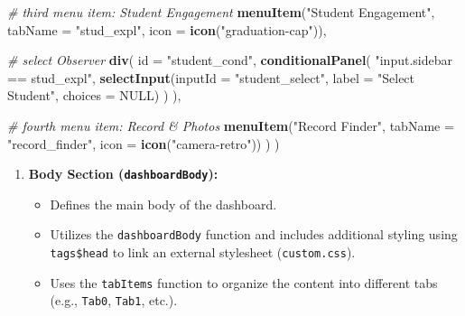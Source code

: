 \documentclass[
]{book}
\newenvironment{Shaded}{\begin{snugshade}}{\end{snugshade}}
\newcommand{\AttributeTok}[1]{\textcolor[rgb]{0.13,0.29,0.53}{#1}}
\newcommand{\CommentTok}[1]{\textcolor[rgb]{0.56,0.35,0.01}{\textit{#1}}}
\newcommand{\ConstantTok}[1]{\textcolor[rgb]{0.56,0.35,0.01}{#1}}
\newcommand{\FunctionTok}[1]{\textcolor[rgb]{0.13,0.29,0.53}{\textbf{#1}}}
\newcommand{\NormalTok}[1]{#1}
\newcommand{\StringTok}[1]{\textcolor[rgb]{0.31,0.60,0.02}{#1}}
\providecommand{\tightlist}{%
  \setlength{\itemsep}{0pt}\setlength{\parskip}{0pt}}
\begin{document}
\begin{Shaded}
\begin{Highlighting}[]
    \CommentTok{\# third menu item: Student Engagement}
    \FunctionTok{menuItem}\NormalTok{(}\StringTok{"Student Engagement"}\NormalTok{, }\AttributeTok{tabName =} \StringTok{"stud\_expl"}\NormalTok{, }\AttributeTok{icon =} \FunctionTok{icon}\NormalTok{(}\StringTok{"graduation{-}cap"}\NormalTok{)),}
    
    \CommentTok{\# select Observer}
    \FunctionTok{div}\NormalTok{(}
      \AttributeTok{id =} \StringTok{"student\_cond"}\NormalTok{,}
      \FunctionTok{conditionalPanel}\NormalTok{(}
        \StringTok{"input.sidebar == \textquotesingle{}stud\_expl\textquotesingle{}"}\NormalTok{,}
        \FunctionTok{selectInput}\NormalTok{(}\AttributeTok{inputId =} \StringTok{"student\_select"}\NormalTok{, }\AttributeTok{label =} \StringTok{"Select Student"}\NormalTok{, }\AttributeTok{choices =} \ConstantTok{NULL}\NormalTok{)}
\NormalTok{      )}
\NormalTok{    ),}
    
    \CommentTok{\# fourth menu item: Record \& Photos}
    \FunctionTok{menuItem}\NormalTok{(}\StringTok{"Record Finder"}\NormalTok{, }\AttributeTok{tabName =} \StringTok{"record\_finder"}\NormalTok{, }\AttributeTok{icon =} \FunctionTok{icon}\NormalTok{(}\StringTok{"camera{-}retro"}\NormalTok{))}
\NormalTok{  )}
\NormalTok{)}
\end{Highlighting}
\end{Shaded}

\begin{enumerate}
\def\labelenumi{\arabic{enumi}.}
\setcounter{enumi}{2}
\tightlist
\item
  \textbf{Body Section (\texttt{dashboardBody}):}

  \begin{itemize}
  \tightlist
  \item
    Defines the main body of the dashboard.
  \item
    Utilizes the \texttt{dashboardBody} function and includes additional styling using \texttt{tags\$head} to link an external stylesheet (\texttt{custom.css}).
  \item
    Uses the \texttt{tabItems} function to organize the content into different tabs (e.g., \texttt{Tab0}, \texttt{Tab1}, etc.).
  \end{itemize}
\end{enumerate}
\end{document}
